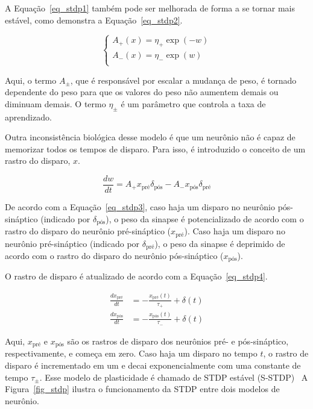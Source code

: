 A Equação~\ref{eq_stdp1} também pode ser melhorada de forma a se tornar mais estável, como demonstra a Equação~\ref{eq_stdp2}.

\begin{equation}
\label{eq_stdp2}
\begin{cases}
    A_{+}(x) = \eta_{+} \exp(-w)\\
    A_{-}(x) = \eta_{-} \exp(w)\\
\end{cases}
\end{equation}

Aqui, o termo $A_{\pm}$, que é responsável por escalar a mudança de peso, é tornado dependente do peso para que os valores do peso
não aumentem demais ou diminuam demais. O termo $\eta_{\pm}$ é um parâmetro que controla a taxa de aprendizado.

Outra inconsistência biológica desse modelo é que um neurônio não é capaz de memorizar todos os tempos de disparo. Para isso, é
introduzido o conceito de um rastro do disparo, $x$.

\begin{equation}
\label{eq_stdp3}
\frac{dw}{dt} = A_{+} x_{\text{pré}} \delta_{\text{pós}} - A_{-} x_{\text{pós}} \delta_{\text{pré}}
\end{equation}

De acordo com a Equação~\ref{eq_stdp3}, caso haja um disparo no neurônio pós-sináptico (indicado por $\delta_{\text{pós}}$), o peso da
sinapse é potencializado de acordo com o rastro do disparo do neurônio pré-sináptico ($x_{\text{pré}}$). Caso haja um disparo no
neurônio pré-sináptico (indicado por $\delta_{\text{pré}}$), o peso da sinapse é deprimido de acordo com o rastro do disparo do neurônio
pós-sináptico ($x_{\text{pós}}$).

O rastro de disparo é atualizado de acordo com a Equação~\ref{eq_stdp4}.

\begin{align}
\label{eq_stdp4}
\frac{dx_{\text{pré}}}{dt} &= -\frac{x_{\text{pré}}(t)}{\tau_{+}}+\delta(t)\\
\frac{dx_{\text{pós}}}{dt} &= -\frac{x_{\text{pós}}(t)}{\tau_{-}}+\delta(t)
\end{align}

Aqui, $x_{\text{pré}}$ e $x_{\text{pós}}$ são os rastros de disparo dos neurônios pré- e pós-sináptico, respectivamente, e começa
em zero. Caso haja um disparo no tempo $t$, o rastro de disparo é incrementado em um e decai exponencialmente com uma constante de
tempo $\tau_{\pm}$. Esse modelo de plasticidade é chamado de STDP estável (S-STDP)~\cite{paredes-vallesUnsupervised2018} A
Figura~\ref{fig_stdp} ilustra o funcionamento da STDP entre dois modelos de neurônio.


